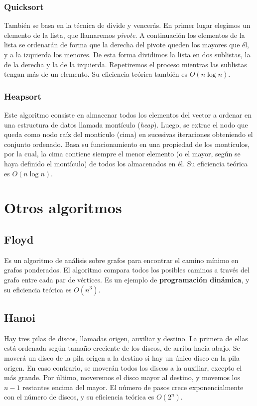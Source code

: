 \documentclass[11pt]{article}
\begin{document}
\subsubsection*{Quicksort}
También se basa en la técnica de divide y vencerás.
En primer lugar elegimos un elemento de la lista, que llamaremos \textit{pivote}. A continuación los elementos de la lista se ordenarán de forma que la derecha del pivote queden los mayores que él, y a la izquierda los menores. De esta forma dividimos la lista en dos sublistas, la de la derecha y la de la izquierda. Repetiremos el proceso mientras las sublistas tengan más de un elemento. Su eficiencia teórica también es $O(n\log n)$.


\subsubsection*{Heapsort}
Este algoritmo consiste en almacenar todos los elementos del vector a ordenar en una estructura de datos llamada montículo (\textit{heap}). Luego, se extrae el nodo que queda como nodo raíz del montículo (cima) en sucesivas iteraciones obteniendo el conjunto ordenado. Basa su funcionamiento en una propiedad de los montículos, por la cual, la cima contiene siempre el menor elemento (o el mayor, según se haya definido el montículo) de todos los almacenados en él. Su eficiencia teórica es $O(n\log n)$.\\

\newpage
\enlargethispage{7\baselineskip}
\section*{Otros algoritmos}
\subsection*{Floyd}
Es un algoritmo de análisis sobre grafos para encontrar el camino mínimo en grafos ponderados. El algoritmo compara todos los posibles caminos a través del grafo entre cada par de vértices. Es un ejemplo de \textbf{programación dinámica}, y su eficiencia teórica es $O(n^3)$.

\subsection*{Hanoi}
Hay tres pilas de discos, llamadas origen, auxiliar y destino. La primera de ellas está ordenada según tamaño creciente de los discos, de arriba hacia abajo. Se moverá un disco de la pila origen a la destino si hay un único disco en la pila origen. En caso contrario, se moverán todos los discos a la auxiliar, excepto el más grande. Por último, moveremos el disco mayor al destino, y movemos los $n-1$ restantes encima del mayor. El número de pasos crece exponencialmente con el número de discos, y su eficiencia teórica es $O(2^n)$.
\end{document}
